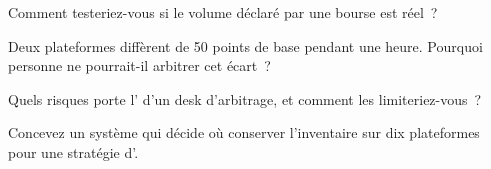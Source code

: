 \begin{interviewq}\label{iq:m3:spot-markets:3}
Comment testeriez-vous si le volume déclaré par une bourse est réel~?
\end{interviewq}

\begin{interviewq}\label{iq:m3:spot-markets:4}
Deux plateformes diffèrent de 50 points de base pendant une heure. Pourquoi personne ne pourrait-il arbitrer cet écart~?
\end{interviewq}

\begin{interviewq}\label{iq:m3:spot-markets:5}
Quels risques porte l' d'un desk d'arbitrage, et comment les limiteriez-vous~?
\end{interviewq}

\begin{interviewq}\label{iq:m3:spot-markets:6}
Concevez un système qui décide où conserver l'inventaire sur dix plateformes pour une stratégie d'.
\end{interviewq}
